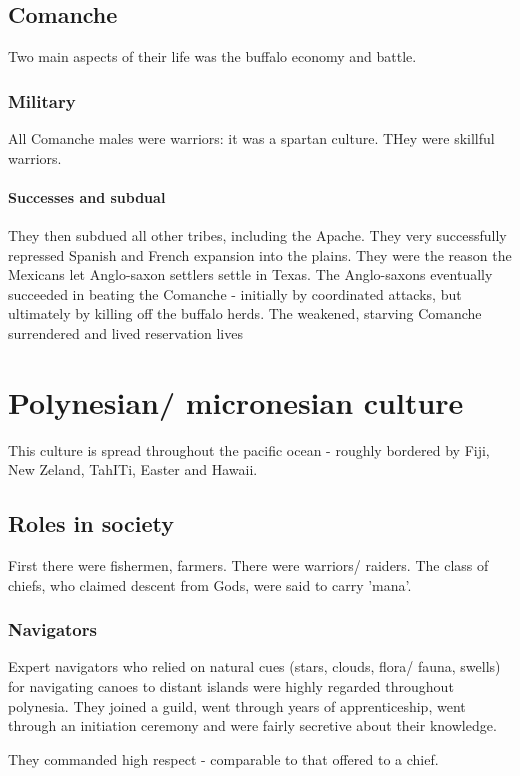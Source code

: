 \documentclass[oneside, article]{memoir}
\begin{document}
\section{Comanche}
Two main aspects of their life was the buffalo economy and battle.

\subsection{Military}
All Comanche males were warriors: it was a spartan culture. THey were skillful warriors.

\subsubsection{Successes and subdual}
They then subdued all other tribes, including the Apache. They very successfully repressed Spanish and French expansion into the plains. They were the reason the Mexicans let Anglo-saxon settlers settle in Texas. The Anglo-saxons eventually succeeded in beating the Comanche - initially by coordinated attacks, but ultimately by killing off the buffalo herds. The weakened, starving Comanche surrendered and lived reservation lives

\chapter{Polynesian/ micronesian culture}
This culture is spread throughout the pacific ocean - roughly bordered by Fiji, New Zeland, TahITi, Easter and Hawaii.

\section{Roles in society}
First there were fishermen, farmers. There were warriors/ raiders. The class of chiefs, who claimed descent from Gods, were said to carry 'mana'.

\subsection{Navigators}
Expert navigators who relied on natural cues (stars, clouds, flora/ fauna, swells) for navigating canoes to distant islands were highly regarded throughout polynesia. They joined a guild, went through years of apprenticeship, went through an initiation ceremony and were fairly secretive about their knowledge.

They commanded high respect - comparable to that offered to a chief.
\end{document}
